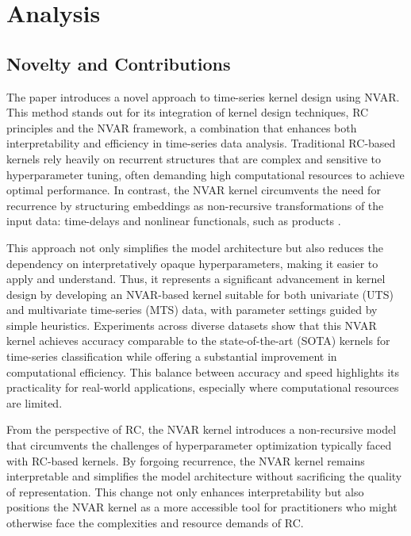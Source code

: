 \chapter{Analysis} \label{chap:analysis}

\section{Novelty and Contributions}

The paper introduces a novel approach to time-series kernel design using NVAR. This method stands out for its integration of kernel design techniques, RC principles and the NVAR framework, a combination that enhances both interpretability and efficiency in time-series data analysis. Traditional RC-based kernels rely heavily on recurrent structures that are complex and sensitive to hyperparameter tuning, often demanding high computational resources to achieve optimal performance. In contrast, the NVAR kernel circumvents the need for recurrence by structuring embeddings as non-recursive transformations of the input data: time-delays and nonlinear functionals, such as products \cite{gauthier2021}.

This approach not only simplifies the model architecture but also reduces the dependency on interpretatively opaque hyperparameters, making it easier to apply and understand. Thus, it represents a significant advancement in kernel design by developing an NVAR-based kernel suitable for both univariate (UTS) and multivariate time-series (MTS) data, with parameter settings guided by simple heuristics. Experiments across diverse datasets show that this NVAR kernel achieves accuracy comparable to the state-of-the-art (SOTA) kernels for time-series classification while offering a substantial improvement in computational efficiency. This balance between accuracy and speed highlights its practicality for real-world applications, especially where computational resources are limited.

From the perspective of RC, the NVAR kernel introduces a non-recursive model that circumvents the challenges of hyperparameter optimization typically faced with RC-based kernels. By forgoing recurrence, the NVAR kernel remains interpretable and simplifies the model architecture without sacrificing the quality of representation. This change not only enhances interpretability but also positions the NVAR kernel as a more accessible tool for practitioners who might otherwise face the complexities and resource demands of RC.

